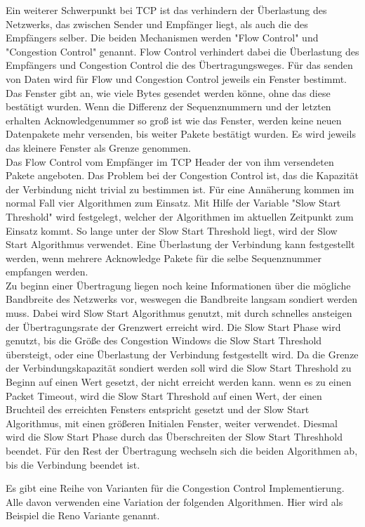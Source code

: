 Ein weiterer Schwerpunkt bei TCP ist das verhindern der Überlastung des Netzwerks, das zwischen Sender und Empfänger liegt, als auch die des Empfängers selber. 
Die beiden Mechanismen werden "Flow Control" und "Congestion Control" genannt. 
Flow Control verhindert dabei die Überlastung des Empfängers und Congestion Control die des Übertragungsweges. 
Für das senden von Daten wird für Flow und Congestion Control jeweils ein Fenster bestimmt. Das Fenster gibt an, wie viele Bytes gesendet werden könne, ohne das diese bestätigt wurden. Wenn die Differenz der Sequenznummern und der letzten erhalten Acknowledgenummer so groß ist wie das Fenster, werden keine neuen Datenpakete mehr versenden, bis weiter Pakete bestätigt wurden. Es wird jeweils das kleinere Fenster als Grenze genommen. \\
Das Flow Control vom Empfänger im TCP Header der von ihm versendeten Pakete angeboten. 
Das Problem bei der Congestion Control ist, das die Kapazität der Verbindung nicht trivial zu bestimmen ist. Für eine Annäherung kommen im normal Fall vier Algorithmen zum Einsatz. Mit Hilfe der Variable "Slow Start Threshold" wird festgelegt, welcher der Algorithmen im aktuellen Zeitpunkt zum Einsatz kommt. So lange unter der Slow Start Threshold liegt, wird der Slow Start Algorithmus verwendet. Eine Überlastung der Verbindung kann festgestellt werden, wenn mehrere Acknowledge Pakete für die selbe Sequenznummer empfangen werden.\\
 Zu beginn einer Übertragung liegen noch keine Informationen über die mögliche Bandbreite des Netzwerks vor, weswegen die Bandbreite langsam sondiert werden muss. Dabei wird Slow Start Algorithmus genutzt, mit durch schnelles ansteigen der Übertragungsrate der Grenzwert erreicht wird. Die Slow Start Phase wird genutzt, bis die Größe des Congestion Windows die Slow Start Threshold übersteigt, oder eine Überlastung der Verbindung festgestellt wird. Da die Grenze der Verbindungskapazität sondiert werden soll wird die Slow Start Threshold zu Beginn auf einen Wert gesetzt, der nicht erreicht werden kann. wenn es zu einen Packet Timeout, wird die Slow Start Threshold auf einen Wert, der einen Bruchteil des erreichten Fensters entspricht gesetzt und der Slow Start Algorithmus, mit einen größeren Initialen Fenster, weiter verwendet. Diesmal wird die Slow Start Phase durch das Überschreiten der Slow Start Threshhold beendet. Für den Rest der Übertragung wechseln sich die beiden Algorithmen ab, bis die Verbindung beendet ist.

Es gibt eine Reihe von Varianten für die Congestion Control Implementierung. Alle davon verwenden eine Variation der folgenden Algorithmen. Hier wird als Beispiel die Reno Variante genannt.


